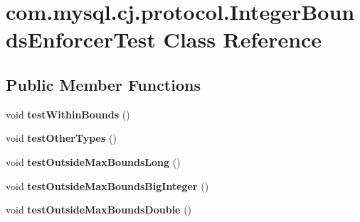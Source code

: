 \hypertarget{classcom_1_1mysql_1_1cj_1_1protocol_1_1_integer_bounds_enforcer_test}{}\section{com.\+mysql.\+cj.\+protocol.\+Integer\+Bounds\+Enforcer\+Test Class Reference}
\label{classcom_1_1mysql_1_1cj_1_1protocol_1_1_integer_bounds_enforcer_test}
\subsection*{Public Member Functions}
\begin{DoxyCompactItemize}
\item 
\mbox{\label{classcom_1_1mysql_1_1cj_1_1protocol_1_1_integer_bounds_enforcer_test_a3353cc6444d842c8bb10d4ff94946677}} 
void {\bfseries test\+Within\+Bounds} ()
\item 
\mbox{\label{classcom_1_1mysql_1_1cj_1_1protocol_1_1_integer_bounds_enforcer_test_aa0a942a4a10989906ca856e272bd9e05}} 
void {\bfseries test\+Other\+Types} ()
\item 
\mbox{\label{classcom_1_1mysql_1_1cj_1_1protocol_1_1_integer_bounds_enforcer_test_a9f83d8d80267d0d89d9339304733e5bf}} 
void {\bfseries test\+Outside\+Max\+Bounds\+Long} ()
\item 
\mbox{\label{classcom_1_1mysql_1_1cj_1_1protocol_1_1_integer_bounds_enforcer_test_a6c88a41405b6317a3027b993c7ec7706}} 
void {\bfseries test\+Outside\+Max\+Bounds\+Big\+Integer} ()
\item 
\mbox{\label{classcom_1_1mysql_1_1cj_1_1protocol_1_1_integer_bounds_enforcer_test_a4edf97bdbf531f5d8ab3bed4f0a58035}} 
void {\bfseries test\+Outside\+Max\+Bounds\+Double} ()
\item 
\mbox{\label{classcom_1_1mysql_1_1cj_1_1protocol_1_1_integer_bounds_enforcer_test_abbcf073ed04e989f985aafb074bd2f65}} 

\end{DoxyCompactItemize}

